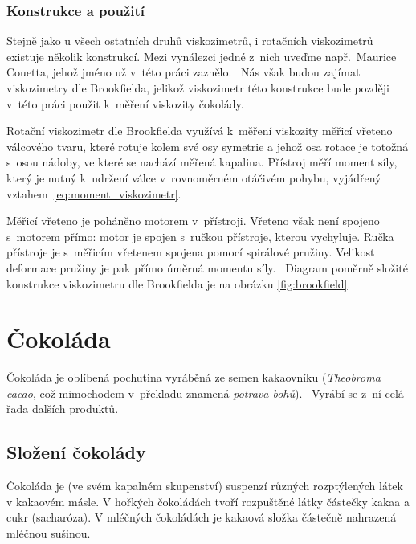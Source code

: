 \documentclass[12pt]{article}
\begin{document}
\subsubsection{Konstrukce a použití}

Stejně jako u všech ostatních druhů viskozimetrů, i rotačních viskozimetrů existuje několik konstrukcí. Mezi vynálezci jedné z~nich uveďme např.~Maurice Couetta, jehož jméno už v~této práci zaznělo.~\cite{wiki:Maurice_Couette} Nás však budou zajímat viskozimetry dle Brookfielda, jelikož viskozimetr této konstrukce bude později v~této práci použit k~měření viskozity čokolády.
\par\noindent
Rotační viskozimetr dle Brookfielda využívá k~měření viskozity měřicí vřeteno válcového tvaru, které rotuje kolem své osy symetrie a jehož osa rotace je totožná s~osou nádoby, ve které se nachází měřená kapalina. Přístroj měří moment síly, který je nutný k~udržení válce v~rovnoměrném otáčivém pohybu, vyjádřený vztahem~\ref{eq:moment_viskozimetr}.
\par\noindent
Měřicí vřeteno je poháněno motorem v~přístroji. Vřeteno však není spojeno s~motorem přímo: motor je spojen s~ručkou přístroje, kterou vychyluje. Ručka přístroje je s~měřicím vřetenem spojena pomocí spirálové pružiny. Velikost deformace pružiny je pak přímo úměrná momentu síly.~\cite{man:brookfield} Diagram poměrně složité konstrukce viskozimetru dle Brookfielda je na obrázku \ref{fig:brookfield}.

\newpage%
\section{Čokoláda}%

Čokoláda je oblíbená pochutina vyráběná ze semen kakaovníku (\emph{Theobroma cacao}, což mimochodem v~překladu znamená \emph{potrava bohů}).~\cite{wiki:Kakao} Vyrábí se z~ní celá řada dalších produktů.

\subsection{Složení čokolády}

Čokoláda je (ve svém kapalném skupenství) suspenzí různých rozptýlených látek v kakaovém másle. V hořkých čokoládách tvoří rozpuštěné látky částečky kakaa a cukr (sacharóza). V mléčných čokoládách je kakaová složka částečně nahrazená mléčnou sušinou.~\cite{Article:chocolate_composition}\cite{Article:Determination_of_chocolate_viscosity}\cite{wiki:Chocolate}
\par\noindent
\end{document}

